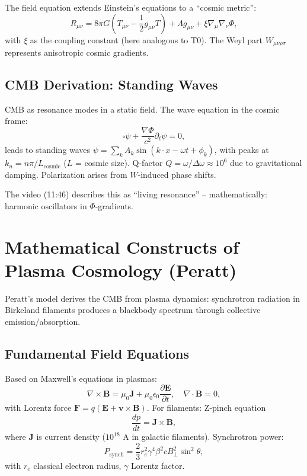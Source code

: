 	The field equation extends Einstein's equations to a ``cosmic metric'':
	\begin{equation}
		R_{\mu\nu} = 8\pi G \left(T_{\mu\nu} - \frac{1}{2} g_{\mu\nu} T\right) + \Lambda g_{\mu\nu} + \xi \nabla_\mu \nabla_\nu \Phi,
	\end{equation}
	with $\xi$ as the coupling constant (here analogous to T0). The Weyl part $W_{\mu\nu\rho\sigma}$ represents anisotropic cosmic gradients.
	
	\subsection{CMB Derivation: Standing Waves}
	CMB as resonance modes in a static field. The wave equation in the cosmic frame:
	\begin{equation}
		\square \psi + \frac{\nabla \Phi}{c^2} \partial_t \psi = 0,
	\end{equation}
	leads to standing waves $\psi = \sum_k A_k \sin(k \cdot x - \omega t + \phi_k)$, with peaks at $k_n = n \pi / L_{\text{cosmic}}$ ($L$ = cosmic size). Q-factor $Q = \omega / \Delta \omega \approx 10^6$ due to gravitational damping. Polarization arises from $W$-induced phase shifts.
	
	The video (11:46) describes this as ``living resonance'' -- mathematically: harmonic oscillators in $\Phi$-gradients.
	
	\section{Mathematical Constructs of Plasma Cosmology (Peratt)}
	Peratt's model \cite{peratt1992} derives the CMB from plasma dynamics: synchrotron radiation in Birkeland filaments produces a blackbody spectrum through collective emission/absorption.
	
	\subsection{Fundamental Field Equations}
	Based on Maxwell's equations in plasmas:
	\begin{equation}
		\nabla \times \mathbf{B} = \mu_0 \mathbf{J} + \mu_0 \epsilon_0 \frac{\partial \mathbf{E}}{\partial t}, \quad \nabla \cdot \mathbf{B} = 0,
	\end{equation}
	with Lorentz force $\mathbf{F} = q(\mathbf{E} + \mathbf{v} \times \mathbf{B})$. For filaments: Z-pinch equation
	\begin{equation}
		\frac{dp}{dt} = \mathbf{J} \times \mathbf{B},
	\end{equation}
	where $\mathbf{J}$ is current density ($10^{18}$ A in galactic filaments). Synchrotron power:
	\begin{equation}
		P_{\text{synch}} = \frac{2}{3} r_e^2 \gamma^4 \beta^2 c B_\perp^2 \sin^2 \theta,
	\end{equation}
	with $r_e$ classical electron radius, $\gamma$ Lorentz factor.
	
